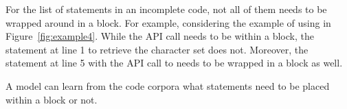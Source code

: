 For the list of statements in an incomplete code, not all of them
needs to be wrapped around in a  block. For example,
considering the example of using  in
Figure~\ref{fig:example4}. While the API call
 needs to be within a
 block, the statement at line 1 to retrieve the
character set does not. Moreover, the statement at line 5 with the API
call to  needs to be wrapped in a 
block as well.






\begin{Observation} 
\label{ob5}
  A model can learn from the code corpora what statements need to be placed
  within a  block or not.
\end{Observation}
